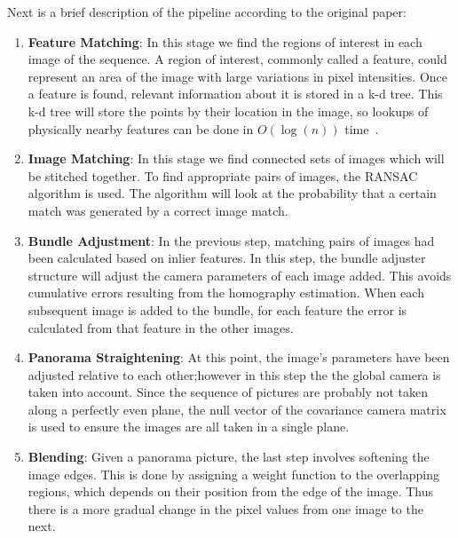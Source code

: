 \documentclass[12pt, a4paper]{article}
\begin{document}
Next is a brief description of the pipeline according to the original paper:
\begin{enumerate}
		\item \textbf{Feature Matching}: In this stage we find the regions of 
				interest in each image of the sequence. A region of interest,
				commonly called a feature, could represent an area of the image
				with large variations in pixel intensities. Once a feature is 
				found, relevant information about it is stored in a k-d tree.
				This k-d tree will store the points by their location in the 
				image, so lookups of physically nearby features can be done 
				in $O(\log(n))$ time~\cite{IntroToAlgorithms}.

		\item \textbf{Image Matching}: In this stage we find connected sets 
				of images which will be stitched together. To find appropriate
				pairs of images, the RANSAC algorithm is used. The algorithm
				will look at the probability that a certain match was generated
				by a correct image match.

		\item \textbf{Bundle Adjustment}: In the previous step, matching pairs
				of images had been calculated based on inlier features. In this 
				step, the bundle adjuster structure will adjust the camera parameters
				of each image added. This avoids cumulative errors resulting from the 
				homography estimation. When each subsequent image is added to the bundle,
				for each feature the error is calculated from that feature in the other 
				images. 
		\item \textbf{Panorama Straightening}: At this point, the image's parameters
				have been adjusted relative to each other;however in this step the 
				the global camera is taken into account. Since the sequence of pictures
				are probably not taken along a perfectly even plane, the null vector of the
				covariance camera matrix is used to ensure the images are all taken 
				in a single plane.
 
		\item \textbf{Blending}: Given a panorama picture, the last step involves softening
				the image edges. This is done by assigning a weight function to the overlapping
				regions, which depends on their position from the edge of the image. Thus there
				is a more gradual change in the pixel values from one image to the next.

\end{enumerate}
\end{document}
